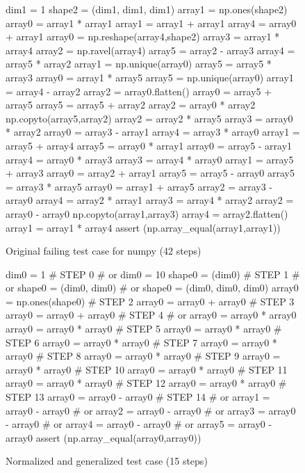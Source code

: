 \begin{figure}
{\scriptsize
\begin{code}
 dim1 = 1 
 shape2 = (dim1, dim1, dim1) 
 array1 = np.ones(shape2) 
 array0 = array1 * array1 
 array1 = array1 + array1 
 array4 = array0 + array1 
 array0 = np.reshape(array4,shape2) 
 array3 = array1 * array4 
 array2 = np.ravel(array4) 
 array5 = array2 - array3 
 array4 = array5 * array2 
 array1 = np.unique(array0) 
 array5 = array5 * array3 
 array0 = array1 * array5 
 array5 = np.unique(array0) 
 array1 = array4 - array2 
 array2 = array0.flatten() 
 array0 = array5 + array5 
 array5 = array5 + array2 
 array2 = array0 * array2 
 np.copyto(array5,array2) 
 array2 = array2 * array5 
 array3 = array0 * array2 
 array0 = array3 - array1 
 array4 = array3 * array0 
 array1 = array5 + array4 
 array5 = array0 * array1 
 array0 = array5 - array1 
 array4 = array0 * array3 
 array3 = array4 * array0 
 array1 = array5 + array3 
 array0 = array2 + array1 
 array5 = array5 - array0 
 array5 = array3 * array5 
 array0 = array1 + array5 
 array2 = array3 - array0 
 array4 = array2 * array1 
 array3 = array4 * array2 
 array2 = array0 - array0 
 np.copyto(array1,array3) 
 array4 = array2.flatten() 
 array1 = array1 * array4
 assert (np.array\_equal(array1,array1))
\end{code}
}
\caption{Original failing test case for numpy (42 steps)}
\end{figure}

\begin{figure}
{\scriptsize
\begin{code}
dim0 = 1                            \# STEP 0
\#  or dim0 = 10 
shape0 = (dim0)                     \# STEP 1
\#  or shape0 = (dim0, dim0) 
\#  or shape0 = (dim0, dim0, dim0) 
array0 = np.ones(shape0)            \# STEP 2
array0 = array0 + array0            \# STEP 3
array0 = array0 + array0            \# STEP 4
\#  or array0 = array0 * array0 
array0 = array0 * array0            \# STEP 5
array0 = array0 * array0            \# STEP 6
array0 = array0 * array0            \# STEP 7
array0 = array0 * array0            \# STEP 8
array0 = array0 * array0            \# STEP 9
array0 = array0 * array0            \# STEP 10
array0 = array0 * array0            \# STEP 11
array0 = array0 * array0            \# STEP 12
array0 = array0 * array0            \# STEP 13
array0 = array0 - array0            \# STEP 14
\#  or array1 = array0 - array0 
\#  or array2 = array0 - array0 
\#  or array3 = array0 - array0 
\#  or array4 = array0 - array0 
\#  or array5 = array0 - array0 
assert (np.array\_equal(array0,array0))
\end{code}
}
\caption{Normalized and generalized test case (15 steps)}
\end{figure}

